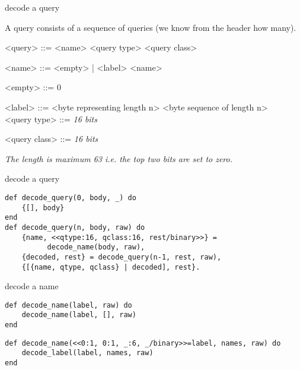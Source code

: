 \begin{frame}{decode a query}

A query consists of a sequence of queries (we know from the header how many).

\begin{grammar}
<query> ::= <name> <query type> <query class>

<name> ::= <empty> | <label> <name>

<empty> ::=  0 

<label> ::=  <byte representing length n> <byte sequence of length n> \\

<query type> ::= {\em 16 bits}

<query class> ::= {\em 16 bits}

\end{grammar}

{\em The length is maximum 63 i.e. the top two bits are set to zero.}

\end{frame}

\begin{frame}[fragile]{decode a query}

\begin{verbatim}
def decode_query(0, body, _) do
    {[], body}
end
def decode_query(n, body, raw) do
    {name, <<qtype:16, qclass:16, rest/binary>>} = 
          decode_name(body, raw),
    {decoded, rest} = decode_query(n-1, rest, raw),
    {[{name, qtype, qclass} | decoded], rest}.
\end{verbatim}

\end{frame}


\begin{frame}[fragile]{decode a name}

\begin{verbatim}
def decode_name(label, raw) do
    decode_name(label, [], raw)
end
\end{verbatim}
\vspace{20pt}\pause

\begin{verbatim}
def decode_name(<<0:1, 0:1, _:6, _/binary>>=label, names, raw) do
    decode_label(label, names, raw)
end
\end{verbatim}
\end{frame}


